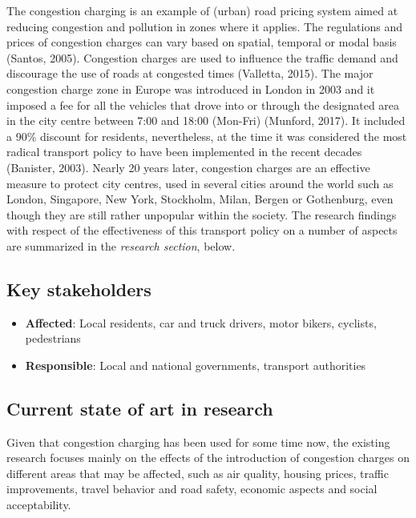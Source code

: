 \documentclass[
]{book}
\providecommand{\tightlist}{%
  \setlength{\itemsep}{0pt}\setlength{\parskip}{0pt}}
\begin{document}
The congestion charging is an example of (urban) road pricing system aimed at reducing congestion and pollution in zones where it applies. The regulations and prices of congestion charges can vary based on spatial, temporal or modal basis (Santos, 2005). Congestion charges are used to influence the traffic demand and discourage the use of roads at congested times (Valletta, 2015). The major congestion charge zone in Europe was introduced in London in 2003 and it imposed a fee for all the vehicles that drove into or through the designated area in the city centre between 7:00 and 18:00 (Mon-Fri) (Munford, 2017). It included a 90\% discount for residents, nevertheless, at the time it was considered the most radical transport policy to have been implemented in the recent decades (Banister, 2003). Nearly 20 years later, congestion charges are an effective measure to protect city centres, used in several cities around the world such as London, Singapore, New York, Stockholm, Milan, Bergen or Gothenburg, even though they are still rather unpopular within the society. The research findings with respect of the effectiveness of this transport policy on a number of aspects are summarized in the \emph{research section}, below.

\hypertarget{key-stakeholders-8}{%
\subsection*{Key stakeholders}\label{key-stakeholders-8}}

\begin{itemize}
\tightlist
\item
  \textbf{Affected}: Local residents, car and truck drivers, motor bikers, cyclists, pedestrians
\item
  \textbf{Responsible}: Local and national governments, transport authorities
\end{itemize}

\hypertarget{current-state-of-art-in-research-8}{%
\subsection*{Current state of art in research}\label{current-state-of-art-in-research-8}}

Given that congestion charging has been used for some time now, the existing research focuses mainly on the effects of the introduction of congestion charges on different areas that may be affected, such as air quality, housing prices, traffic improvements, travel behavior and road safety, economic aspects and social acceptability.
\end{document}

